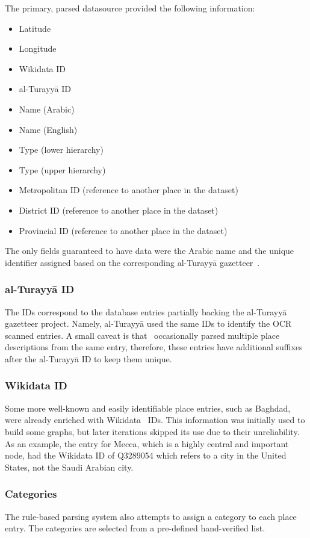 The primary, parsed datasource provided the following information:
\begin{itemize}
    \item Latitude
    \item Longitude
    \item Wikidata ID
    \item al-Turayyā ID~\cite{AlTurayya}
    \item Name (Arabic)
    \item Name (English)
    \item Type (lower hierarchy)
    \item Type (upper hierarchy)
    \item Metropolitan ID (reference to another place in the dataset)
    \item District ID (reference to another place in the dataset)
    \item Provincial ID (reference to another place in the dataset)
\end{itemize}


The only fields guaranteed to have data were the Arabic name and the unique identifier assigned based on the corresponding al-Turayyā gazetteer~\cite{AlTurayya}.

\subsubsection{al-Turayyā ID}
The IDs correspond to the database entries partially backing the al-Turayyā gazetteer project.
Namely, al-Turayyā used the same IDs to identify the OCR scanned entries.
A small caveat is that~\cite{YaqutRB} occasionally parsed multiple place descriptions from the same entry,
therefore, these entries have additional suffixes after the al-Turayyā ID to keep them unique.

\subsubsection{Wikidata ID}
Some more well-known and easily identifiable place entries, such as Baghdad, were already enriched with Wikidata~\cite{Wikidata} IDs.
This information was initially used to build some graphs, but later iterations skipped its use due to their unreliability.
As an example, the entry for Mecca, which is a highly central and important node, had the Wikidata ID of Q3289054
which refers to a city in the United States, not the Saudi Arabian city.

\subsubsection{Categories}
The rule-based parsing system also attempts to assign a category to each place entry.
The categories are selected from a pre-defined hand-verified list.

